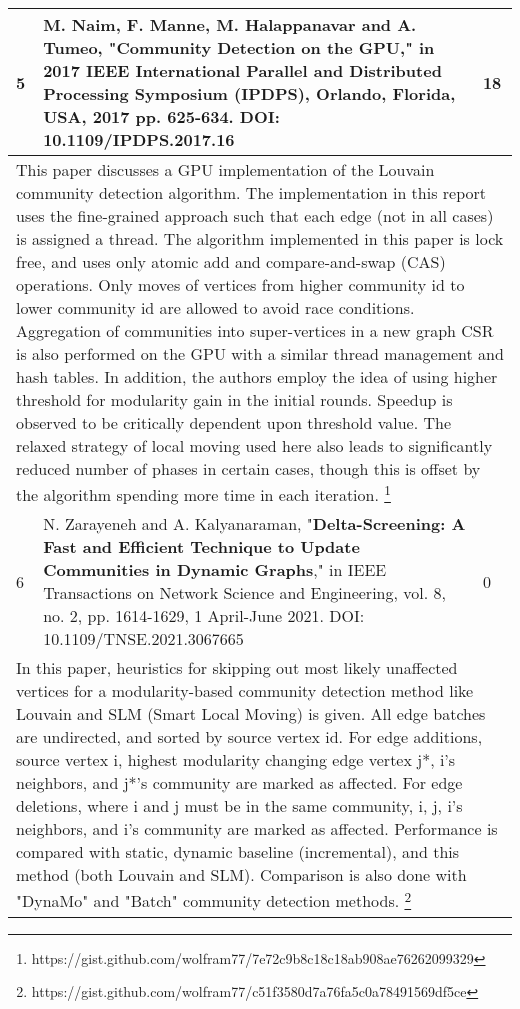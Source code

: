 \begin{longtable}[!hbtp]{|p{1cm}|p{11cm}|p{2cm}|}
  5 &
  M. Naim, F. Manne, M. Halappanavar and A. Tumeo,  "\textbf{Community Detection on the GPU}," in 2017 IEEE International Parallel and Distributed Processing Symposium (IPDPS), Orlando, Florida, USA, 2017 pp. 625-634.\linebreak
  DOI: 10.1109/IPDPS.2017.16 &
  18 \\ \hline
  \multicolumn{3}{|p{14cm}|}{This paper discusses a GPU implementation of the Louvain community detection algorithm. The implementation in this report uses the fine-grained approach such that each edge (not in all cases) is assigned a thread. The algorithm implemented in this paper is lock free, and uses only atomic add and compare-and-swap (CAS) operations. Only moves of vertices from higher community id to lower community id are allowed to avoid race conditions. Aggregation of communities into super-vertices in a new graph CSR is also performed on the GPU with a similar thread management and hash tables. In addition, the authors employ the idea of using higher threshold for modularity gain in the initial rounds. Speedup is observed to be critically dependent upon threshold value. The relaxed strategy of local moving used here also leads to significantly reduced number of phases in certain cases, though this is offset by the algorithm spending more time in each iteration. \footnote{https://gist.github.com/wolfram77/7e72c9b8c18c18ab908ae76262099329}} \\ \hline

  6 &
  N. Zarayeneh and A. Kalyanaraman, "\textbf{Delta-Screening: A Fast and Efficient Technique to Update Communities in Dynamic Graphs}," in IEEE Transactions on Network Science and Engineering, vol. 8, no. 2, pp. 1614-1629, 1 April-June 2021.\linebreak
  DOI: 10.1109/TNSE.2021.3067665 &
  0 \\ \hline
  \multicolumn{3}{|p{14cm}|}{In this paper, heuristics for skipping out most likely unaffected vertices for a modularity-based community detection method like Louvain and SLM (Smart Local Moving) is given. All edge batches are undirected, and sorted by source vertex id. For edge additions, source vertex i, highest modularity changing edge vertex j*, i's neighbors, and j*'s community are marked as affected. For edge deletions, where i and j must be in the same community, i, j, i's neighbors, and i's community are marked as affected. Performance is compared with static, dynamic baseline (incremental), and this method (both Louvain and SLM). Comparison is also done with "DynaMo" and "Batch" community detection methods. \footnote{https://gist.github.com/wolfram77/c51f3580d7a76fa5c0a78491569df5ce}} \\ \hline


\end{longtable}
